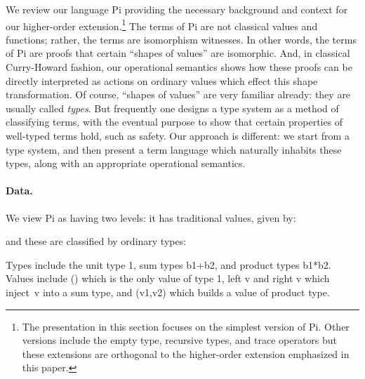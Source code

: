 \documentclass[preprint]{sigplanconf}
\begin{document}
We review our language {{Pi}} providing the necessary background and
context for our higher-order extension.\footnote{The presentation in this
  section focuses on the simplest version of {{Pi}}. Other versions
  include the empty type, recursive types, and trace operators but these
  extensions are orthogonal to the higher-order extension emphasized in this
  paper.} The terms of {{Pi}} are not classical values and functions;
rather, the terms are isomorphism witnesses.  In other words, the terms of
{{Pi}} are proofs that certain ``shapes of values'' are isomorphic.
And, in classical Curry-Howard fashion, our operational semantics shows how
these proofs can be directly interpreted as actions on ordinary values which
effect this shape transformation. Of course, ``shapes of values'' are very
familiar already: they are usually called \emph{types}.  But frequently one
designs a type system as a method of classifying terms, with the eventual
purpose to show that certain properties of well-typed terms hold, such as
safety.  Our approach is different: we start from a type system, and then
present a term language which naturally inhabits these types, along with an
appropriate operational semantics.

\paragraph*{Data.}
We view {{Pi}} as having two levels:  it has traditional values, given by:

\noindent and these are classified by ordinary types:

\noindent 
Types include the unit type {{1}}, sum types {{b1+b2}}, and
product types {{b1*b2}}.  Values include {{()}} which is the only value of
type {{1}}, {{left v}} and {{right v}} which inject~{{v}} into a sum type,
and {{(v1,v2)}} which builds a value of product type. 

\end{document}
